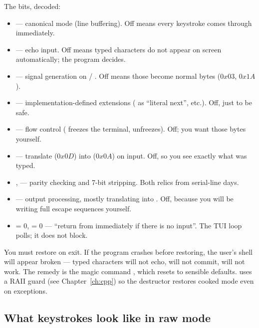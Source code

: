 The bits, decoded:

\begin{itemize}[leftmargin=*]
  \item {} --- canonical mode (line buffering). Off means
    every keystroke comes through immediately.
  \item {} --- echo input. Off means typed characters do not
    appear on screen automatically; the program decides.
  \item {} --- signal generation on  /
    . Off means those become normal bytes ($0x03$,
    $0x1A$).
  \item {} --- implementation-defined extensions
    ( as ``literal next'', etc.). Off, just to be
    safe.
  \item {} --- flow control ( freezes the
    terminal,  unfreezes). Off; you want those bytes
    yourself.
  \item {} --- translate  ($0x0D$) into 
    ($0x0A$) on input. Off, so you see exactly what was typed.
  \item {},  --- parity checking and 7-bit
    stripping. Both relics from serial-line days.
  \item {} --- output processing, mostly translating
     into . Off, because you will be writing
    full escape sequences yourself.
  \item {} = 0,  = 0 --- ``return from
     immediately if there is no input''. The TUI loop
    polls; it does not block.
\end{itemize}

\begin{warning}
You must restore  on exit. If the program crashes before
restoring, the user's shell will appear broken --- typed characters
will not echo,  will not commit,  will not
work. The remedy is the magic command , which resets
 to sensible defaults. \maya{} uses a RAII guard (see
Chapter~\ref{ch:cpp}) so the destructor restores cooked mode even on
exceptions.
\end{warning}

\subsection{What keystrokes look like in raw mode}

